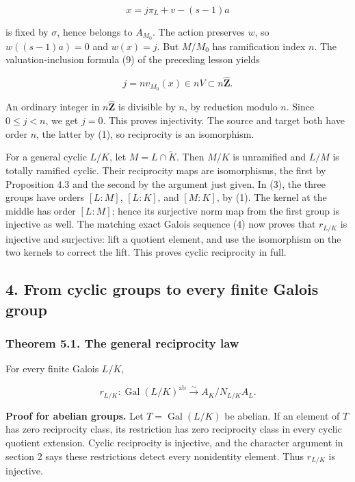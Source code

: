 \documentclass[11pt,a4paper]{article}
\begin{document}
\[
x=j\pi_L+v-(s-1)a
\]

is fixed by \(\sigma\), hence belongs to \(A_{M_0}\). The action
preserves \(w\), so \(w((s-1)a)=0\) and \(w(x)=j\). But \(M/M_0\) has
ramification index \(n\). The valuation-inclusion formula (9) of the
preceding lesson yields

\[
j=n v_{M_0}(x)\in nV\subset n\widehat{\mathbf Z}.
\]

An ordinary integer in \(n\widehat{\mathbf Z}\) is divisible by \(n\),
by reduction modulo \(n\). Since \(0\leq j<n\), we get \(j=0\). This
proves injectivity. The source and target both have order \(n\), the
latter by (1), so reciprocity is an isomorphism.

For a general cyclic \(L/K\), let \(M=L\cap\widetilde K\). Then \(M/K\)
is unramified and \(L/M\) is totally ramified cyclic. Their reciprocity
maps are isomorphisms, the first by Proposition 4.3 and the second by
the argument just given. In (3), the three groups have orders \([L:M]\),
\([L:K]\), and \([M:K]\), by (1). The kernel at the middle has order
\([L:M]\); hence its surjective norm map from the first group is
injective as well. The matching exact Galois sequence (4) now proves
that \(r_{L/K}\) is injective and surjective: lift a quotient element,
and use the isomorphism on the two kernels to correct the lift. This
proves cyclic reciprocity in full.

\subsection{4. From cyclic groups to every finite Galois
group}\label{from-cyclic-groups-to-every-finite-galois-group}

\subsubsection{Theorem 5.1. The general reciprocity
law}\label{theorem-5.1.-the-general-reciprocity-law}

For every finite Galois \(L/K\),

\[
r_{L/K}:\operatorname{Gal}(L/K)^{\mathrm{ab}}
\xrightarrow{\sim} A_K/N_{L/K}A_L.
\tag{6}
\]

\textbf{Proof for abelian groups.} Let \(T=\operatorname{Gal}(L/K)\) be
abelian. If an element of \(T\) has zero reciprocity class, its
restriction has zero reciprocity class in every cyclic quotient
extension. Cyclic reciprocity is injective, and the character argument
in section 2 says these restrictions detect every nonidentity element.
Thus \(r_{L/K}\) is injective.
\end{document}
